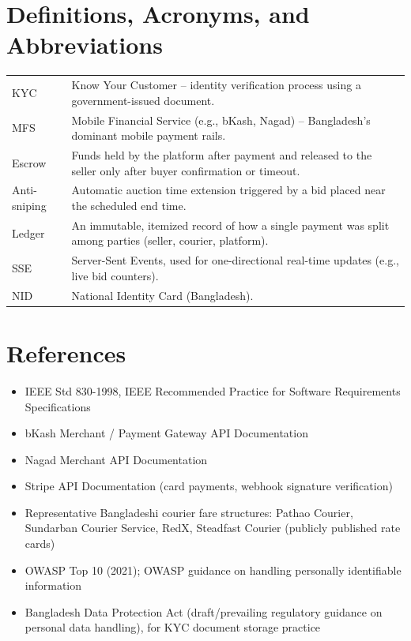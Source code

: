 \documentclass[11pt,a4paper]{report}
\newenvironment{deftable}{\begin{longtable}{p{3.5cm}p{10.2cm}}}{\end{longtable}}
\begin{document}
\section{Definitions, Acronyms, and Abbreviations}
\begin{deftable}
KYC & Know Your Customer -- identity verification process using a government-issued document. \\
MFS & Mobile Financial Service (e.g., bKash, Nagad) -- Bangladesh's dominant mobile payment rails. \\
Escrow & Funds held by the platform after payment and released to the seller only after buyer confirmation or timeout. \\
Anti-sniping & Automatic auction time extension triggered by a bid placed near the scheduled end time. \\
Ledger & An immutable, itemized record of how a single payment was split among parties (seller, courier, platform). \\
SSE & Server-Sent Events, used for one-directional real-time updates (e.g., live bid counters). \\
NID & National Identity Card (Bangladesh). \\
\end{deftable}

\section{References}
\begin{itemize}[nosep]
    \item IEEE Std 830-1998, IEEE Recommended Practice for Software Requirements Specifications
    \item bKash Merchant / Payment Gateway API Documentation
    \item Nagad Merchant API Documentation
    \item Stripe API Documentation (card payments, webhook signature verification)
    \item Representative Bangladeshi courier fare structures: Pathao Courier, Sundarban Courier Service, RedX, Steadfast Courier (publicly published rate cards)
    \item OWASP Top 10 (2021); OWASP guidance on handling personally identifiable information
    \item Bangladesh Data Protection Act (draft/prevailing regulatory guidance on personal data handling), for KYC document storage practice
\end{itemize}
\end{document}
